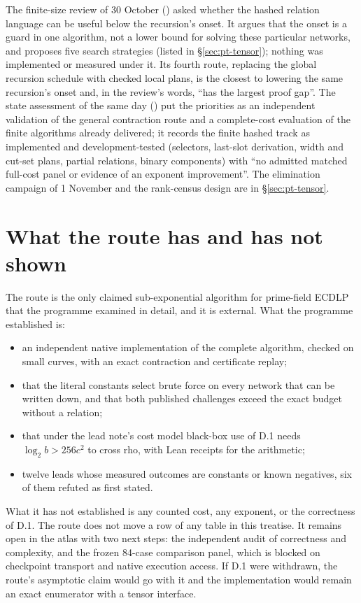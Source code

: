 The finite-size review of 30 October
() asked whether
the hashed relation language can be useful below the recursion's onset. It
argues that the onset is a guard in one algorithm, not a lower bound for
solving these particular networks, and proposes five search strategies
(listed in \S\ref{sec:pt-tensor}); nothing was implemented or measured
under it. Its fourth route, replacing the global recursion schedule with
checked local plans, is the closest to lowering the same recursion's onset
and, in the review's words, ``has the largest proof gap''. The state
assessment of the same day
() put the priorities as
an independent validation of the general contraction route and a
complete-cost evaluation of the finite algorithms already delivered; it
records the finite hashed track as implemented and development-tested
(selectors, last-slot derivation, width and cut-set plans, partial
relations, binary components) with ``no admitted matched full-cost panel or
evidence of an exponent improvement''. The elimination campaign of
1 November and the rank-census design are in \S\ref{sec:pt-tensor}.

\section{What the route has and has not shown}\label{sec:tn-reading}

The route is the only claimed sub-exponential algorithm for prime-field
ECDLP that the programme examined in detail, and it is external. What the
programme established is:
\begin{itemize}
\item an independent native implementation of the complete algorithm,
  checked on small curves, with an exact contraction and certificate
  replay;
\item that the literal constants select brute force on every network that
  can be written down, and that both published challenges exceed the exact
  budget without a relation;
\item that under the lead note's cost model black-box use of D.1 needs
  $\log_2b>256c^2$ to cross rho, with Lean receipts for the arithmetic;
\item twelve leads whose measured outcomes are constants or known
  negatives, six of them refuted as first stated.
\end{itemize}
What it has not established is any counted cost, any exponent, or the
correctness of D.1. The route does not move a row of any table in this
treatise. It remains open in the atlas with two next steps: the independent
audit of correctness and complexity, and the frozen 84-case comparison
panel, which is blocked on checkpoint transport and native execution access.
If D.1 were withdrawn, the route's asymptotic claim would go with it and the
implementation would remain an exact enumerator with a tensor interface.

